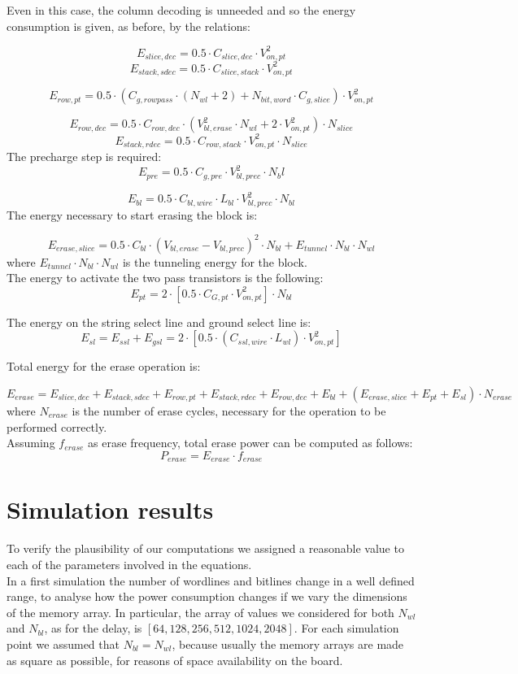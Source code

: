 Even in this case, the column decoding is unneeded and so the energy consumption is given, as before, by the relations: 

\[
E_{slice,dec}= 0.5 \cdot C_{slice,dec} \cdot V_{on,pt}^2
\]
\[
E_{stack,sdec}=0.5 \cdot C_{slice,stack} \cdot V_{on,pt}^2
\]

\[
E_{row,pt}= 0.5 \cdot (C_{g,rowpass} \cdot (N_{wl}+2) + N_{bit,word} \cdot C_{g,slice} ) \cdot V_{on,pt}^2
\]

\[
E_{row,dec}= 0.5 \cdot C_{row,dec} \cdot (V_{bl,erase}^2 \cdot N_{wl} + 2 \cdot V_{on,pt}^2) \cdot N_{slice}
\]
\[
E_{stack,rdec}=0.5 \cdot C_{row,stack} \cdot V_{on,pt}^2 \cdot N_{slice}
\]
The precharge step is required:
\[
E_{pre}= 0.5 \cdot C_{g,pre} \cdot V_{bl,prec}^2 \cdot N_bl
\]

\[
E_{bl}= 0.5 \cdot C_{bl,wire} \cdot L_{bl} \cdot V_{bl,prec}^2 \cdot N_{bl}
\]
The energy necessary to start erasing the block is:


\[
E_{erase,slice}=0.5 \cdot C_{bl} \cdot (V_{bl,erase}-V_{bl,prec})^2 \cdot N_{bl}+E_{tunnel} \cdot N_{bl} \cdot N_{wl}
\]
where $E_{tunnel} \cdot N_{bl} \cdot N_{wl}$ is the tunneling energy for the block.\\
The energy to activate the two pass transistors is the following:
\[
E_{pt}= 2 \cdot [0.5 \cdot C_{G,pt} \cdot V_{on,pt}^2] \cdot N_{bl}
\]

The energy on the string select line and ground select  line is:
\[
E_{sl}=E_{ssl}+ E_{gsl} = 2 \cdot [0.5 \cdot (C_{ssl,wire}\cdot L_{wl}) \cdot V_{on,pt}^2]
\]


Total energy for the erase operation is:

\[
E_{erase}=E_{slice,dec}+E_{stack,sdec}+E_{row,pt}+E_{stack,rdec}+E_{row,dec}+E_{bl}+(E_{erase,slice}+E_{pt}+E_{sl}) \cdot N_{erase}
\]	
where $N_{erase}$ is the number of erase cycles, necessary for the operation to be performed correctly.\\
Assuming $f_{erase}$ as erase frequency, total erase power can be computed as follows:
\[
P_{erase}=E_{erase}\cdot f_{erase}
\]

\section{Simulation results}
To verify the plausibility of our computations we assigned a reasonable value to each of the parameters involved in the equations.\\
In a first simulation the number of wordlines and bitlines change in a well defined range, to analyse how the power consumption changes if we vary the dimensions of the memory array. In particular, the array of values we considered for both $N_{wl}$ and $N_{bl}$, as for the delay, is $[64, 128, 256, 512, 1024, 2048]$. For each simulation point we assumed that $N_{bl}=N_{wl}$, because usually the memory arrays are made as square as possible, for reasons of space availability on the board.\\

